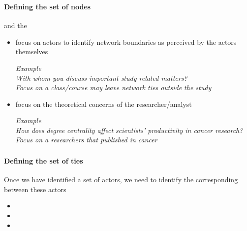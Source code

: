 \documentclass[8pt]{beamer}
\begin{document}
\begin{frame}
\frametitle{\insertsection}
\framesubtitle{Defining the set of nodes}


\citet{Laumann1989} and the {\color{blue}{'boundary specification problem'}}
		
	\begin{itemize}[<+(1)->]
	\item {\color{blue}{Realist approach:}} focus on actors to identify network boundaries as perceived by the actors themselves\\		
		
		\medskip
		
		\textit{Example\\
		With whom you discuss important study related matters?\\
		Focus on a class/course may leave network ties outside the study}
		
		\medskip
		
	\item {\color{blue}{Nominalist approach:}} focus on the theoretical concerns of the researcher/analyst\\
		
		\medskip
		
		\textit{Example\\
		How does degree centrality affect scientists' productivity in cancer research?\\
		Focus on a researchers that published in cancer}
	
	\end{itemize}
\centering
		
\medskip
	


\end{frame}



\begin{frame}
\frametitle{\insertsection}
\framesubtitle{Defining the set of ties}

Once we have identified a set of actors, we need to identify the corresponding  {\color{blue}{set of ties}} between these actors

\medskip

\begin{itemize}
\item {\color{blue}{Full-network method}}
\item {\color{blue}{Snowball method}}
\item {\color{blue}{Ego-centric method}}
\end{itemize}

\end{frame}
\end{document}

